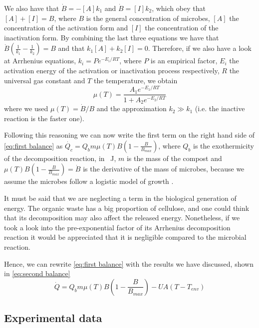 \documentclass[12pt, a4paper, twocolumn]{article}
\numberwithin{table}{section}
\numberwithin{figure}{section}
\numberwithin{equation}{section}
\begin{document}
We also have that $\dot{B}=-[A]k_1$ and $\dot{B}=[I]k_2$, which obey that $[A]+[I]=B$, where $B$ is the general concentration of microbes, $[A]$ the concentration of the activation form and $[I]$ the concentration of the inactivation form. By combining the last three equations we have that $\dot{B}(\frac{1}{k_1}-\frac{1}{k_2})=B$ and that $k_1[A]+k_2[I]=0$. Therefore, if we also have a look at Arrhenius equations, $k_i=Pe^{-E_i/RT}$, where $P$ is an empirical factor, $E_i$ the activation energy of the activation or inactivation process respectively, $R$ the universal gas constant and $T$ the temperature, we obtain 
\begin{equation} \label{eq:mumax}
    \mu(T)=\frac{A_1e^{-E_1/RT}}{1+A_2e^{-E_2/RT}}
\end{equation}
where we used $\mu(T)=\dot{B}/B$ and the approximation $k_2\gg k_1$ (i.e. the inactive reaction is the faster one).

Following this reasoning we can now write the first term on the right hand side of \cref{eq:first balance} as $\dot{Q_c}=Q_bm\mu(T)B\left(1-\frac{B}{B_{max}}\right)$, where $Q_b$ is the exothermicity of the decomposition reaction, in \SI{}{J}, $m$ is the mass of the compost and $\mu(T)B\left(1-\frac{B}{B_{max}}\right)=\dot{B}$ is the derivative of the mass of microbes, because we assume the microbes follow a logistic model of growth \cite{saucedo}. 

It must be said that we are neglecting a term in the biological generation of energy. The organic waste has a big proportion of cellulose, and one could think that its decomposition may also affect the released energy. Nonetheless, if we took a look into the pre-exponential factor of its Arrhenius decomposition reaction it would be appreciated that it is negligible compared to the microbial reaction.

Hence, we can rewrite \cref{eq:first balance} with the results we have discussed, shown in \cref{eq:second balance}
\begin{equation}\label{eq:second balance}
    \dot{Q}=Q_bm\mu(T)B\left(1-\frac{B}{B_{max}}\right)-UA(T -T_{env})
\end{equation}

\subsection{Experimental data}
\end{document}

